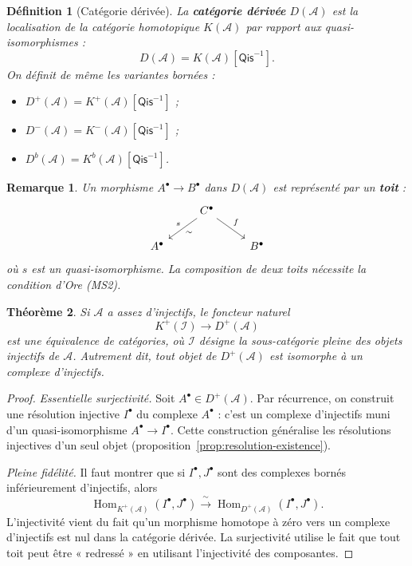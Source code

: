 \documentclass[a4paper,12pt]{book}
\DeclareMathOperator{\Hom}{Hom}
\newtheorem{theoreme}{Théorème}[chapter]
\newtheorem{definition}[theoreme]{Définition}
\newtheorem*{remarque}{Remarque}
\begin{document}
\begin{definition}[Catégorie dérivée]\label{def:derived-category}
La \textbf{catégorie dérivée} $D(\mathcal{A})$ est la localisation de la
catégorie homotopique $K(\mathcal{A})$ par rapport aux quasi-isomorphismes :
\[
  D(\mathcal{A}) = K(\mathcal{A})[\mathsf{Qis}^{-1}].
\]
On définit de même les variantes bornées :
\begin{itemize}
\item $D^+(\mathcal{A}) = K^+(\mathcal{A})[\mathsf{Qis}^{-1}]$ ;
\item $D^-(\mathcal{A}) = K^-(\mathcal{A})[\mathsf{Qis}^{-1}]$ ;
\item $D^b(\mathcal{A}) = K^b(\mathcal{A})[\mathsf{Qis}^{-1}]$.
\end{itemize}
\end{definition}

\begin{remarque}\label{rem:derived-category-morphisms}
Un morphisme $A^\bullet \to B^\bullet$ dans $D(\mathcal{A})$ est
représenté par un \textbf{toit} :
\[
\begin{tikzcd}
& C^\bullet \arrow[dl, "s"', "\sim"] \arrow[dr, "f"] \\
A^\bullet & & B^\bullet
\end{tikzcd}
\]
où $s$ est un quasi-isomorphisme. La composition de deux toits
nécessite la condition d'Ore (MS2).
\end{remarque}

\begin{theoreme}\label{thm:derived-via-injectives}
Si $\mathcal{A}$ a assez d'injectifs, le foncteur naturel
\[
  K^+(\mathcal{I}) \longrightarrow D^+(\mathcal{A})
\]
est une équivalence de catégories, où $\mathcal{I}$ désigne la
sous-catégorie pleine des objets injectifs de $\mathcal{A}$.
Autrement dit, tout objet de $D^+(\mathcal{A})$ est isomorphe à
un complexe d'injectifs.
\end{theoreme}

\begin{proof}
\emph{Essentielle surjectivité.} Soit $A^\bullet \in D^+(\mathcal{A})$.
Par récurrence, on construit une résolution injective
$I^\bullet$ du complexe $A^\bullet$ : c'est un complexe d'injectifs
muni d'un quasi-isomorphisme $A^\bullet \to I^\bullet$. Cette
construction généralise les résolutions injectives d'un seul objet
(proposition~\ref{prop:resolution-existence}).

\emph{Pleine fidélité.} Il faut montrer que si $I^\bullet, J^\bullet$
sont des complexes bornés inférieurement d'injectifs, alors
\[
  \Hom_{K^+(\mathcal{A})}(I^\bullet, J^\bullet)
  \xrightarrow{\;\sim\;} \Hom_{D^+(\mathcal{A})}(I^\bullet, J^\bullet).
\]
L'injectivité vient du fait qu'un morphisme homotope à zéro vers un
complexe d'injectifs est nul dans la catégorie dérivée. La surjectivité
utilise le fait que tout toit peut être « redressé » en utilisant
l'injectivité des composantes.
\end{proof}
\end{document}
